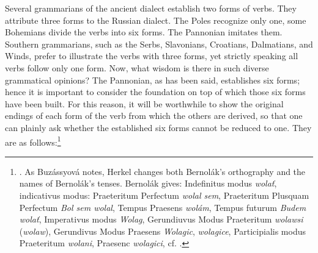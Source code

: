 Several grammarians of the ancient dialect establish two forms of verbs. They attribute three forms to the Russian dialect. The Poles recognize only one, \linebreak{}some Bohemians divide the verbs into six forms. The Pannonian imitates them. Southern grammarians, such as the Serbs, Slavonians, Croatians, Dalmatians, and Winds, prefer to illustrate the verbs with three forms, yet strictly speaking all verbs follow only one form. Now, what wisdom is there in such diverse grammatical opinions? The Pannonian, as has been said, establishes six forms; hence it is important to consider the foundation on top of which those six forms have been built. For this reason, it will be worthwhile to show the original endings of each form of the verb from which the others are derived, so that one can plainly ask whether the established six forms cannot be reduced to one. They are as follows:\footnote{\citet[101--138]{bernolak_grammatica_1790}. As Buzássyová notes, Herkel changes both Bernolák’s orthography and the names of Bernolák’s tenses. Bernolák gives: Indefinitus modus \textit{wolať}, indicativus modus: Praeteritum Perfectum \textit{wolal sem}, Praeteritum Plusquam Perfectum \textit{Bol sem wolal}, Tempus Praesens \textit{wolám}, Tempus futurum \textit{Budem wolať}, Imperativus modus \textit{Wolag}, Gerundiuvus Modus Praeteritum \textit{wolawsi} (\textit{wolaw}), Gerundivus Modus Praesens \textit{Wolagic}, \textit{wolagice}, Participialis modus Praeteritum \textit{wolani}, Praesenc \textit{wolagici}, cf. \citet[216]{herkel_jan_2009}.}

